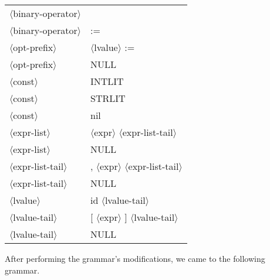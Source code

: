 \documentclass[11pt, fleqn]{article}
\newcommand{\atag}[1]{$\langle$#1$\rangle$}
\begin{document}
\begin{longtable}{l|l}
\atag{binary-operator}			&	\textbar		\\
\atag{binary-operator}			&	:=	\\
\atag{opt-prefix}				&	\atag{lvalue} :=		\\
\atag{opt-prefix}				&	NULL		\\
\atag{const}						&	INTLIT		\\
\atag{const}						&	STRLIT		\\
\atag{const}						&	nil		\\
\atag{expr-list}					&	\atag{expr} \atag{expr-list-tail}		\\
\atag{expr-list}					&	NULL		\\
\atag{expr-list-tail}			&	, \atag{expr} \atag{expr-list-tail}		\\
\atag{expr-list-tail}			&	NULL		\\
\atag{lvalue}					&	id \atag{lvalue-tail}		\\
\atag{lvalue-tail}				&	[ \atag{expr} ] \atag{lvalue-tail}		\\
\atag{lvalue-tail}				&	NULL		\\
\end{longtable}

After performing the grammar's modifications, we came to the following grammar.
\end{document}
